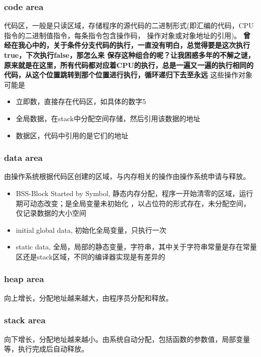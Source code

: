 \subsubsection{code area}
代码区，一般是只读区域，存储程序的源代码的二进制形式(即汇编的代码，CPU指令的二进制值指令，每条指令包含操作码，
操作对象或对象地址的引用)。
\newline
\textbf{曾经在我心中的，关于条件分支代码的执行，一直没有明白，总觉得要是这次执行true，下次执行false，那怎么来
保存这种组合的呢？让我困惑多年的不解之谜，原来就是在这里，所有代码都对应着CPU的执行，总是一遍又一遍的执行相同的
代码，从这个位置跳转到那个位置进行执行，循环递归下去至永远}
\newline
这些操作对象可能是
\begin{itemize}
    \item {立即数，直接存在代码区，如具体的数字5}
    \item {全局数据，在stack中分配空间存储，然后引用该数据的地址}
    \item {数据区，代码中引用的是它们的地址}
\end{itemize}

\subsubsection{data area}
由操作系统根据代码区创建的区域，与内存相关的操作由操作系统申请与释放。
\begin{itemize}
    \item {BSS-Block Started by Symbol, 静态内存分配，程序一开始清零的区域，运行期可动态改变；是全局变量未初始化
    ，以占位符的形式存在，未分配空间，仅记录数据的大小空间
    }
    \item {initial global data, 初始化全局变量，只执行一次}
    \item {static data, 全局，局部的静态变量，字符串，其中关于字符串常量是存在常量区还是stack区域，不同的编译器实现是有差异的}
\end{itemize}

\subsubsection{heap area}
向上增长，分配地址越来越大，由程序员分配和释放。

\subsubsection{stack area}
向下增长，分配地址越来越小。由系统自动分配，包括函数的参数值，局部变量等，执行完成后自动释放。

